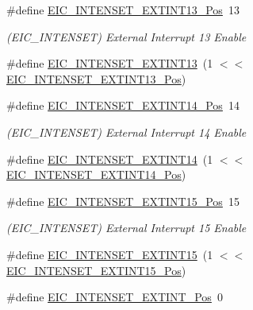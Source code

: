 \begin{DoxyCompactItemize}
\item 
\#define \mbox{\hyperlink{group___s_a_m_d21___e_i_c_ga2af04d8820ffa025bb1082d3407b0ac7}{E\+I\+C\+\_\+\+I\+N\+T\+E\+N\+S\+E\+T\+\_\+\+E\+X\+T\+I\+N\+T13\+\_\+\+Pos}}~13
\begin{DoxyCompactList}\small\item\em (E\+I\+C\+\_\+\+I\+N\+T\+E\+N\+S\+ET) External Interrupt 13 Enable \end{DoxyCompactList}\item 
\#define \mbox{\hyperlink{group___s_a_m_d21___e_i_c_ga2ae3ed5aa1828d63960496a6d417a701}{E\+I\+C\+\_\+\+I\+N\+T\+E\+N\+S\+E\+T\+\_\+\+E\+X\+T\+I\+N\+T13}}~(1 $<$$<$ \mbox{\hyperlink{group___s_a_m_d21___e_i_c_ga2af04d8820ffa025bb1082d3407b0ac7}{E\+I\+C\+\_\+\+I\+N\+T\+E\+N\+S\+E\+T\+\_\+\+E\+X\+T\+I\+N\+T13\+\_\+\+Pos}})
\item 
\#define \mbox{\hyperlink{group___s_a_m_d21___e_i_c_ga2b67a69b30c95a0f89c4cf524d506046}{E\+I\+C\+\_\+\+I\+N\+T\+E\+N\+S\+E\+T\+\_\+\+E\+X\+T\+I\+N\+T14\+\_\+\+Pos}}~14
\begin{DoxyCompactList}\small\item\em (E\+I\+C\+\_\+\+I\+N\+T\+E\+N\+S\+ET) External Interrupt 14 Enable \end{DoxyCompactList}\item 
\#define \mbox{\hyperlink{group___s_a_m_d21___e_i_c_gabbf26aa5a97d7f5e20e8a8cdcfe7cebd}{E\+I\+C\+\_\+\+I\+N\+T\+E\+N\+S\+E\+T\+\_\+\+E\+X\+T\+I\+N\+T14}}~(1 $<$$<$ \mbox{\hyperlink{group___s_a_m_d21___e_i_c_ga2b67a69b30c95a0f89c4cf524d506046}{E\+I\+C\+\_\+\+I\+N\+T\+E\+N\+S\+E\+T\+\_\+\+E\+X\+T\+I\+N\+T14\+\_\+\+Pos}})
\item 
\#define \mbox{\hyperlink{group___s_a_m_d21___e_i_c_gae2bef3759a1e7b986ca3b1a6f3968be8}{E\+I\+C\+\_\+\+I\+N\+T\+E\+N\+S\+E\+T\+\_\+\+E\+X\+T\+I\+N\+T15\+\_\+\+Pos}}~15
\begin{DoxyCompactList}\small\item\em (E\+I\+C\+\_\+\+I\+N\+T\+E\+N\+S\+ET) External Interrupt 15 Enable \end{DoxyCompactList}\item 
\#define \mbox{\hyperlink{group___s_a_m_d21___e_i_c_ga18995aee60fc71ee2facb676cbd3333d}{E\+I\+C\+\_\+\+I\+N\+T\+E\+N\+S\+E\+T\+\_\+\+E\+X\+T\+I\+N\+T15}}~(1 $<$$<$ \mbox{\hyperlink{group___s_a_m_d21___e_i_c_gae2bef3759a1e7b986ca3b1a6f3968be8}{E\+I\+C\+\_\+\+I\+N\+T\+E\+N\+S\+E\+T\+\_\+\+E\+X\+T\+I\+N\+T15\+\_\+\+Pos}})
\item 
\#define \mbox{\hyperlink{group___s_a_m_d21___e_i_c_gafd6be1eb2fc6554616eb65915a12c245}{E\+I\+C\+\_\+\+I\+N\+T\+E\+N\+S\+E\+T\+\_\+\+E\+X\+T\+I\+N\+T\+\_\+\+Pos}}~0
$$
\end{DoxyCompactItemize}
